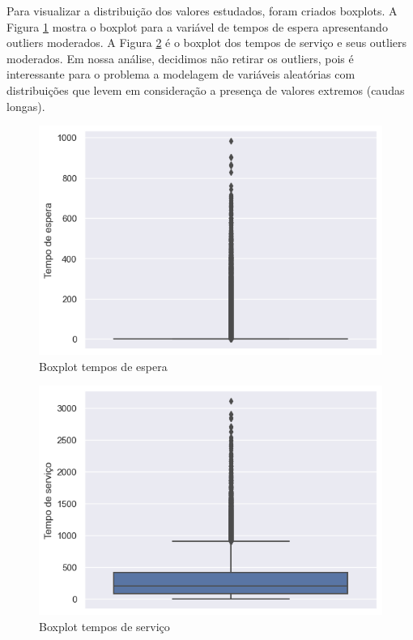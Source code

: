Para visualizar a distribuição dos valores estudados, foram criados boxplots. A Figura \ref*{fig: box-wait} mostra o boxplot para a variável de tempos de espera apresentando outliers moderados. A Figura \ref*{fig: box-time} é o boxplot dos tempos de serviço e seus outliers moderados. Em nossa análise, decidimos não retirar os outliers, pois é interessante para o problema a modelagem de variáveis aleatórias com distribuições que levem em consideração a presença de valores extremos (caudas longas).

\begin{figure}[ht]
    \includegraphics{analise-de-dados/anual/box-wait.png}
    \caption{Boxplot tempos de espera}
    \label{fig: box-wait}
\end{figure}

\begin{figure}[ht]
    \includegraphics{analise-de-dados/anual/box-service.png}
    \caption{Boxplot tempos de serviço}
    \label{fig: box-time}
\end{figure}


